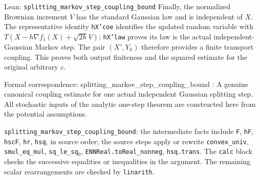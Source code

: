 \documentclass[11pt,a4paper]{report}
\begin{document}
\begin{leanbox}{Lean: \texttt{splitting\_\allowbreak{}markov\_\allowbreak{}step\_\allowbreak{}coupling\_\allowbreak{}bound}}
Finally, the normalized Brownian increment \(V\) has the standard Gaussian law and is independent of \(X\). The representative identity \texttt{h\allowbreak{}X'coe} identifies the updated random variable with \(T(X-h\nabla f_1(X)+\sqrt{2h}V)\); \texttt{h\allowbreak{}X'law} proves its law is the actual independent-Gaussian Markov step. The pair \((X',Y_h)\) therefore provides a finite transport coupling. This proves both output finiteness and the squared estimate for the original arbitrary \(c\).



Formal correspondence: splitting\_markov\_step\_coupling\_bound : A genuine canonical coupling estimate for one actual independent Gaussian splitting step. All stochastic inputs of the analytic one-step theorem are constructed here from the potential assumptions.



\texttt{splitting\_\allowbreak{}markov\_\allowbreak{}step\_\allowbreak{}coupling\_\allowbreak{}bound}: the intermediate facts include \texttt{F}, \texttt{h\allowbreak{}F}, \texttt{hsc\allowbreak{}F}, \texttt{hr}, \texttt{hsq}, in source order; the source steps apply or rewrite \texttt{convex\_\allowbreak{}univ}, \texttt{smul\_\allowbreak{}eq\_\allowbreak{}mul}, \texttt{sq\_\allowbreak{}le\_\allowbreak{}sq\ensuremath{{}_{0}}}, \texttt{ENNReal.\allowbreak{}to\allowbreak{}Real\_\allowbreak{}nonneg}, \texttt{hsq.\allowbreak{}trans}. The \texttt{calc} block checks the successive equalities or inequalities in the argument. The remaining scalar rearrangements are checked by \texttt{linarith}.
\end{leanbox}
\end{document}
